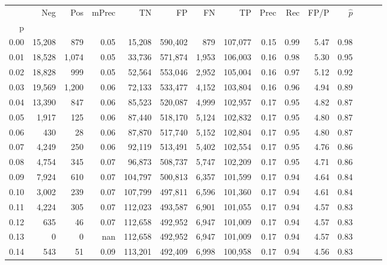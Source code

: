 \begin{tabular}{rrrrrrrrrrrrrrr}
\toprule
{} &     Neg &    Pos & mPrec &       TN &       FP &       FN &       TP &  Prec &   Rec &  FP/P & $\hat{p}$ \\
p    &         &        &       &          &          &          &          &       &       &       &           \\
\midrule
0.00 &  15,208 &    879 &  0.05 &   15,208 &  590,402 &      879 &  107,077 &  0.15 &  0.99 &  5.47 &      0.98 \\
0.01 &  18,528 &  1,074 &  0.05 &   33,736 &  571,874 &    1,953 &  106,003 &  0.16 &  0.98 &  5.30 &      0.95 \\
0.02 &  18,828 &    999 &  0.05 &   52,564 &  553,046 &    2,952 &  105,004 &  0.16 &  0.97 &  5.12 &      0.92 \\
0.03 &  19,569 &  1,200 &  0.06 &   72,133 &  533,477 &    4,152 &  103,804 &  0.16 &  0.96 &  4.94 &      0.89 \\
0.04 &  13,390 &    847 &  0.06 &   85,523 &  520,087 &    4,999 &  102,957 &  0.17 &  0.95 &  4.82 &      0.87 \\
0.05 &   1,917 &    125 &  0.06 &   87,440 &  518,170 &    5,124 &  102,832 &  0.17 &  0.95 &  4.80 &      0.87 \\
0.06 &     430 &     28 &  0.06 &   87,870 &  517,740 &    5,152 &  102,804 &  0.17 &  0.95 &  4.80 &      0.87 \\
0.07 &   4,249 &    250 &  0.06 &   92,119 &  513,491 &    5,402 &  102,554 &  0.17 &  0.95 &  4.76 &      0.86 \\
0.08 &   4,754 &    345 &  0.07 &   96,873 &  508,737 &    5,747 &  102,209 &  0.17 &  0.95 &  4.71 &      0.86 \\
0.09 &   7,924 &    610 &  0.07 &  104,797 &  500,813 &    6,357 &  101,599 &  0.17 &  0.94 &  4.64 &      0.84 \\
0.10 &   3,002 &    239 &  0.07 &  107,799 &  497,811 &    6,596 &  101,360 &  0.17 &  0.94 &  4.61 &      0.84 \\
0.11 &   4,224 &    305 &  0.07 &  112,023 &  493,587 &    6,901 &  101,055 &  0.17 &  0.94 &  4.57 &      0.83 \\
0.12 &     635 &     46 &  0.07 &  112,658 &  492,952 &    6,947 &  101,009 &  0.17 &  0.94 &  4.57 &      0.83 \\
0.13 &       0 &      0 &   nan &  112,658 &  492,952 &    6,947 &  101,009 &  0.17 &  0.94 &  4.57 &      0.83 \\
0.14 &     543 &     51 &  0.09 &  113,201 &  492,409 &    6,998 &  100,958 &  0.17 &  0.94 &  4.56 &      0.83 \\

\end{tabular}
